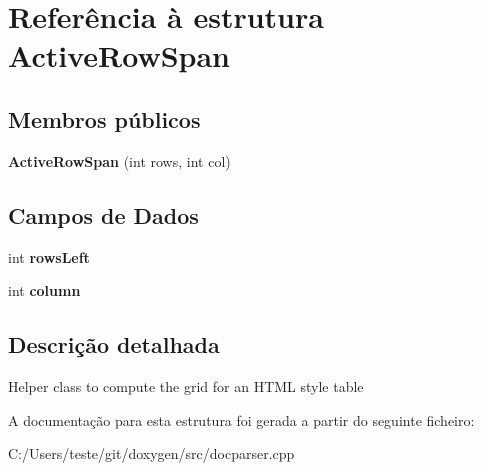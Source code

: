 \hypertarget{struct_active_row_span}{\section{Referência à estrutura Active\-Row\-Span}
\label{struct_active_row_span}
}
\subsection*{Membros públicos}
\begin{DoxyCompactItemize}
\item 
\hypertarget{struct_active_row_span_a4d9d472030bddcae47e2f1b838fcc941}{{\bfseries Active\-Row\-Span} (int rows, int col)}\label{struct_active_row_span_a4d9d472030bddcae47e2f1b838fcc941}

\end{DoxyCompactItemize}
\subsection*{Campos de Dados}
\begin{DoxyCompactItemize}
\item 
\hypertarget{struct_active_row_span_a3311ae32e15ba38b689bdabe2f5184bc}{int {\bfseries rows\-Left}}\label{struct_active_row_span_a3311ae32e15ba38b689bdabe2f5184bc}

\item 
\hypertarget{struct_active_row_span_a60dae4c6e78188cd718b696e4f08fc71}{int {\bfseries column}}\label{struct_active_row_span_a60dae4c6e78188cd718b696e4f08fc71}

\end{DoxyCompactItemize}


\subsection{Descrição detalhada}
Helper class to compute the grid for an H\-T\-M\-L style table 

A documentação para esta estrutura foi gerada a partir do seguinte ficheiro\-:\begin{DoxyCompactItemize}
\item 
C\-:/\-Users/teste/git/doxygen/src/docparser.\-cpp\end{DoxyCompactItemize}
